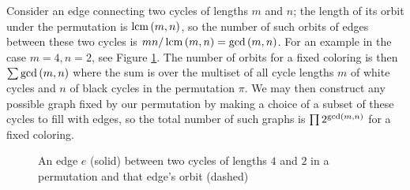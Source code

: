 \documentclass[sectionflow,singlespace,twoside,boldmathhdr]{brandiss} %
\numberwithin{section}{chapter}
\numberwithin{figure}{chapter}
\begin{document}
Consider an edge connecting two cycles of lengths $m$ and $n$; the length of its orbit under the permutation is $\operatorname{lcm} \left( {m, n} \right)$, so the number of such orbits of edges between these two cycles is $mn / \operatorname{lcm} \left( {m, n} \right) = \gcd \left( {m, n} \right)$.
For an example in the case $m = 4, n = 2$, see Figure \ref{fig:exbcecycle}.
The number of orbits for a fixed coloring is then $\sum \gcd \left( {m, n} \right)$ where the sum is over the multiset of all cycle lengths $m$ of white cycles and $n$ of black cycles in the permutation $\pi$.
We may then construct any possible graph fixed by our permutation by making a choice of a subset of these cycles to fill with edges, so the total number of such graphs is $\prod 2^{\gcd \left( {m, n} \right)}$ for a fixed coloring.

\begin{figure}[htb]
  \centering

  \caption[Example edge-orbit of a color-preserving automorphism]{An edge $e$ (solid) between two cycles of lengths $4$ and $2$ in a permutation and that edge's orbit (dashed)}
  \label{fig:exbcecycle}
\end{figure}
\end{document}
